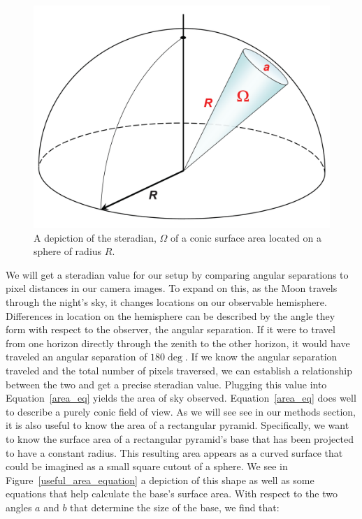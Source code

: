 \begin{figure}[ht!]
  \centering
  \includegraphics[scale=0.07]{images/solidangle.png}
  \caption{A depiction of the steradian, $\Omega$ of a conic surface area located on a sphere of radius $R$.}
  \label{solid_ang}
\end{figure}

We will get a steradian value for our setup by comparing angular separations to pixel distances in our camera images.
To expand on this, as the Moon travels through the night's sky, it changes locations on our observable hemisphere.
Differences in location on the hemisphere can be described by the angle they form with respect to the observer, the angular separation.
If it were to travel from one horizon directly through the zenith to the other horizon, it would have traveled an angular separation of $180 \deg$.  
If we know the angular separation traveled and the total number of pixels traversed, we can establish a relationship between the two and get a precise steradian value.
Plugging this value into Equation~\ref{area_eq} yields the area of sky observed.
Equation~\ref{area_eq} does well to describe a purely conic field of view.
As we will see see in our methods section, it is also useful to know the area of a rectangular pyramid.
Specifically, we want to know the surface area of a rectangular pyramid's base that has been projected to have a constant radius. 
This resulting area appears as a curved surface that could be imagined as a small square cutout of a sphere.
We see in Figure~\ref{useful_area_equation} a depiction of this shape as well as some equations that help calculate the base's surface area.
With respect to the two angles $a$ and $b$ that determine the size of the base, we find that:

